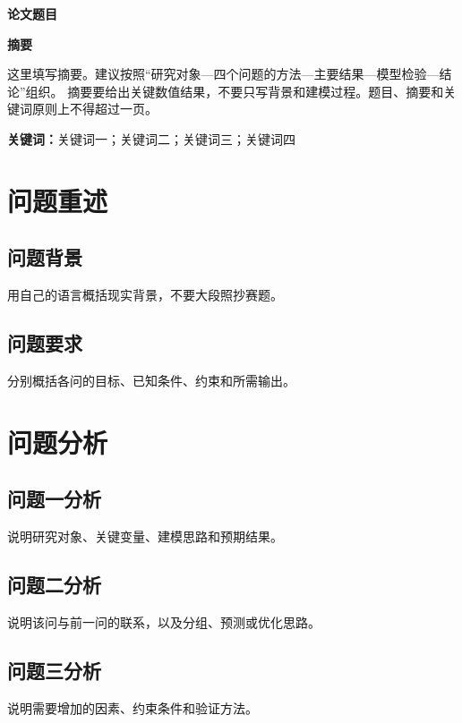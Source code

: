 \documentclass[UTF8,a4paper,12pt,fontset=fandol]{ctexart}
\begin{document}
\setcounter{page}{1}

\begin{center}
  {\bfseries 论文题目}
\end{center}

\begin{center}
  {\bfseries 摘\quad 要}
\end{center}

这里填写摘要。建议按照“研究对象—四个问题的方法—主要结果—模型检验—结论”组织。
摘要要给出关键数值结果，不要只写背景和建模过程。题目、摘要和关键词原则上不得超过一页。

\vspace{0.8em}
\noindent\textbf{关键词：}关键词一；关键词二；关键词三；关键词四

\newpage

\section{问题重述}
\subsection{问题背景}
用自己的语言概括现实背景，不要大段照抄赛题。

\subsection{问题要求}
分别概括各问的目标、已知条件、约束和所需输出。

\section{问题分析}
\subsection{问题一分析}
说明研究对象、关键变量、建模思路和预期结果。

\subsection{问题二分析}
说明该问与前一问的联系，以及分组、预测或优化思路。

\subsection{问题三分析}
说明需要增加的因素、约束条件和验证方法。
\end{document}
